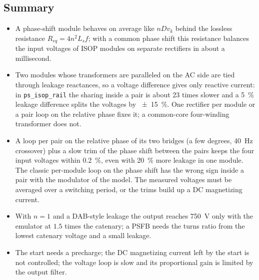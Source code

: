 \documentclass[10pt,a4paper]{scrartcl}
\newcommand{\code}[1]{\texttt{#1}}
\newcommand{\Req}{R_{eq}}
\newcommand{\Ls}{L_s}
\begin{document}
\begin{onehalfspace}
\section{Summary}
\label{sec:summary}

\begin{itemize}
\item A phase-shift module behaves on average like $n D v_k$ behind the lossless resistance $\Req = 4n^2\Ls f$; with a common phase shift this resistance balances the input voltages of ISOP modules on separate rectifiers in about a millisecond.
\item Two modules whose transformers are paralleled on the AC side are tied through leakage reactances, so a voltage difference gives only reactive current: in \code{ps\_isop\_rail} the sharing inside a pair is about 23 times slower and a \SI{5}{\percent} leakage difference splits the voltages by \SI{\pm 15}{\percent}. One rectifier per module or a pair loop on the relative phase fixes it; a common-core four-winding transformer does not.
\item A loop per pair on the relative phase of its two bridges (a few degrees, \SI{40}{Hz} crossover) plus a slow trim of the phase shift between the pairs keeps the four input voltages within \SI{0.2}{\percent}, even with \SI{20}{\percent} more leakage in one module. The classic per-module loop on the phase shift has the wrong sign inside a pair with the modulator of the model. The measured voltages must be averaged over a switching period, or the trims build up a DC magnetizing current.
\item With $n = 1$ and a DAB-style leakage the output reaches \SI{750}{V} only with the emulator at $1.5$ times the catenary; a PSFB needs the turns ratio from the lowest catenary voltage and a small leakage.
\item The start needs a precharge; the DC magnetizing current left by the start is not controlled; the voltage loop is slow and its proportional gain is limited by the output filter.
\end{itemize}


\end{onehalfspace}
\end{document}
